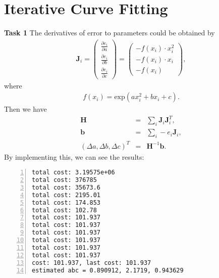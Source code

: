 \documentclass[12pt,a4paper]{article}
\newcommand{\vct}[1]{\boldsymbol{#1}}
\newcommand{\mtx}[1]{\mathbf{#1}}
\newcommand{\fnc}[1]{\text{#1}}
\begin{document}
    \section{Iterative Curve Fitting}
    \textsf{\textbf{Task 1}}
    The derivatives of error to parameters could be obtained by
    \begin{eqnarray}\label{eq:cf_j}
      \vct{J}_i
      = \begin{pmatrix}
          \frac{\partial e_i}{\partial a} \\
          \frac{\partial e_i}{\partial b} \\
          \frac{\partial e_i}{\partial c}
        \end{pmatrix}
      = \begin{pmatrix}
          -f(x_i) \cdot x_i^2 \\
          -f(x_i) \cdot x_i \\
          -f(x_i) 
        \end{pmatrix},
    \end{eqnarray}
    where
    \begin{eqnarray}\label{eq:cf_f}
      f(x_i) = \fnc{exp}(a x_i^2 + b x_i + c).
    \end{eqnarray}
    Then we have
    \begin{eqnarray}\label{eq:cf_f}
      \mtx{H} &=& \sum_i \vct{J}_i \vct{J}_i^T, \nonumber\\
      \vct{b} &=& \sum_i - e_i \vct{J}_i, \nonumber\\
      (\Delta a, \Delta b, \Delta c)^T &=& \mtx{H}^{-1} \vct{b}.
    \end{eqnarray}
    By implementing this, we can see the results:
    \begin{lstlisting}[frame=single,numbers=left]
total cost: 3.19575e+06
total cost: 376785
total cost: 35673.6
total cost: 2195.01
total cost: 174.853
total cost: 102.78
total cost: 101.937
total cost: 101.937
total cost: 101.937
total cost: 101.937
total cost: 101.937
total cost: 101.937
cost: 101.937, last cost: 101.937
estimated abc = 0.890912, 2.1719, 0.943629
    \end{lstlisting}
    
\end{document}
